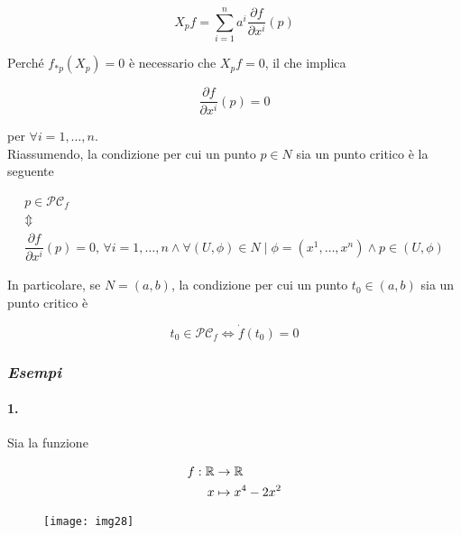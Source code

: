 \begin{equation}
	X_{p} f = \sum_{i=1}^{n} a^{i} \dfrac{\partial f}{\partial x^{i}} (p)
\end{equation}

Perché $ f_{*p}(X_{p}) = 0 $ è necessario che $ X_{p} f = 0 $, il che implica

\begin{equation}
	\dfrac{\partial f}{\partial x^{i}} (p) = 0
\end{equation}

per $ \forall i=1,\dots,n $.\\
Riassumendo, la condizione per cui un punto $ p \in N $ sia un punto critico è la seguente

\begin{gather}
	p \in \mathcal{PC}_{f}\nonumber\\
	\Updownarrow\\
	\dfrac{\partial f}{\partial x^{i}} (p) = 0, \, \forall i=1,\dots,n \wedge \forall (U,\phi) \in N \mid \phi = (x^{1},\dots,x^{n}) \wedge p \in (U,\phi)\nonumber
\end{gather}

In particolare, se $ N = (a,b) $, la condizione per cui un punto $ t_{0} \in (a,b) $ sia un punto critico è

\begin{equation}
	t_{0} \in \mathcal{PC}_{f} \iff \dot{f}(t_{0}) = 0
\end{equation}

\subsubsection{\textit{Esempi}}

\paragraph{1.}

Sia la funzione

\begin{align}
	\begin{split}
		f : \mathbb{R} &\to \mathbb{R}\\
		x &\mapsto x^{4} - 2 x^{2}
	\end{split}
\end{align}

\begin{figure}[H]
	\centering
	\texttt{[image: img28]}
\end{figure}

